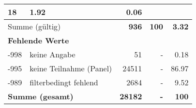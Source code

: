 \begin{longtable}{lXrrr}
       \num{18} &
       \num[round-mode=places,round-precision=2]{1.92} &
         \num[round-mode=places,round-precision=2]{0.06} \\
     \midrule
     \multicolumn{2}{l}{Summe (gültig)} &
       \textbf{\num{936}} &
     \textbf{100} &
       \textbf{\num[round-mode=places,round-precision=2]{3.32}} \\
     \multicolumn{5}{l}{\textbf{Fehlende Werte}}\\
       -998 &
       keine Angabe &
         \num{51} &
        - &
         \num[round-mode=places,round-precision=2]{0.18} \\
       -995 &
       keine Teilnahme (Panel) &
         \num{24511} &
        - &
         \num[round-mode=places,round-precision=2]{86.97} \\
       -989 &
       filterbedingt fehlend &
         \num{2684} &
        - &
         \num[round-mode=places,round-precision=2]{9.52} \\
     \midrule
     \multicolumn{2}{l}{\textbf{Summe (gesamt)}} &
          \textbf{\num{28182}} &
        \textbf{-} &
        \textbf{100} \\
     \bottomrule
     \end{longtable}
     
